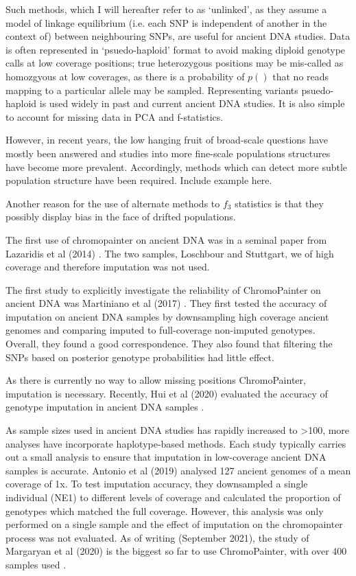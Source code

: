 Such methods, which I will hereafter refer to as `unlinked', as they assume a model of linkage equilibrium (i.e. each SNP is independent of another in the context of) between neighbouring SNPs, are useful for ancient DNA studies.  Data is often represented in `psuedo-haploid' format to avoid making diploid genotype calls at low coverage positions; true heterozygous positions may be mis-called as homozgyous at low coverages, as there is a probability of $p()$ that no reads mapping to a particular allele may be sampled. Representing variants psuedo-haploid is used widely in past and current ancient DNA studies. It is also simple to account for missing data in PCA and f-statistics.    

However, in recent years, the low hanging fruit of broad-scale questions have mostly been answered and studies into more fine-scale populations structures have become more prevalent. Accordingly, methods which can detect more subtle population structure have been required. Include example here. 


Another reason for the use of alternate methods to $f_{3}$ statistics is that they possibly display bias in the face of drifted populations. 


The first use of chromopainter on ancient DNA was in a seminal paper from Lazaridis et al (2014) \cite{Lazaridis2014}. The two samples, Loschbour and Stuttgart, we of high coverage and therefore imputation was not used.

The first study to explicitly investigate the reliability of ChromoPainter on ancient DNA was Martiniano et al (2017) \cite{Martiniano2017}. They first tested the accuracy of imputation on ancient DNA samples by downsampling high coverage ancient genomes and comparing imputed to full-coverage non-imputed genotypes. Overall, they found a good correspondence. They also found that filtering the SNPs based on posterior genotype probabilities had little effect. 

As there is currently no way to allow missing positions ChromoPainter, imputation is necessary. Recently, Hui et al (2020) evaluated the accuracy of genotype imputation in ancient DNA samples \cite{hui2020evaluating}. 

As sample sizes used in ancient DNA studies has rapidly increased to >100, more analyses have incorporate haplotype-based methods. Each study typically carries out a small analysis to ensure that imputation in low-coverage ancient DNA samples is accurate. Antonio et al (2019) \cite{antonio2019ancient} analysed 127 ancient genomes of a mean coverage of 1x. To test imputation accuracy, they downsampled a single individual (NE1) to different levels of coverage and calculated the proportion of genotypes which matched the full coverage. However, this analysis was only performed on a single sample and the effect of imputation on the chromopainter process was not evaluated. As of writing (September 2021), the study of Margaryan et al (2020) is the biggest so far to use ChromoPainter, with over 400 samples used \cite{margaryan2020population}.

